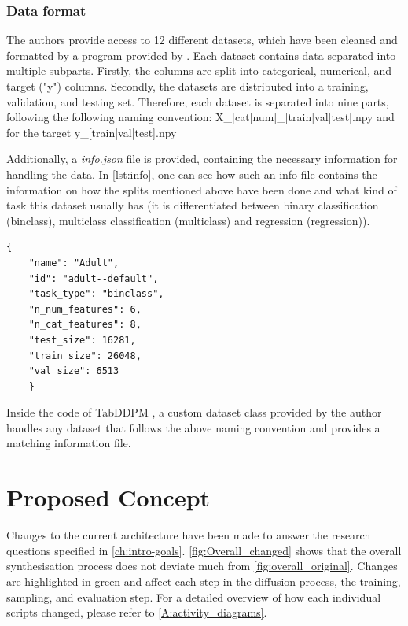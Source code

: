 \subsubsection[]{Data format}
\label{sec:data_format}
The authors provide access to 12 different datasets, which have been cleaned and formatted by a program provided by \cite{gorishniy2023EmbeddingsNumericalFeatures}.
Each dataset contains data separated into multiple subparts.
Firstly, the columns are split into categorical, numerical, and target ("y") columns.
Secondly, the datasets are distributed into a training, validation, and testing set.
Therefore, each dataset is separated into nine parts, following the following naming convention:
X\_[cat|num]\_[train|val|test].npy and for the target y\_[train|val|test].npy

Additionally, a \textit{info.json} file is provided, containing the necessary information for handling the data.
In \autoref{lst:info}, one can see how such an info-file contains the information on how the splits mentioned above have been done and what kind of task this dataset usually has (it is differentiated between binary classification (binclass), multiclass classification (multiclass) and regression (regression)).
\begin{lstlisting}[label={lst:info},caption={Example Data-info File}]
    {
    "name": "Adult",
    "id": "adult--default",
    "task_type": "binclass",
    "n_num_features": 6,
    "n_cat_features": 8,
    "test_size": 16281,
    "train_size": 26048,
    "val_size": 6513
    }
\end{lstlisting}
Inside the code of TabDDPM \cite{akim2023TabDDPMModellingTabular}, a custom dataset class provided by the author handles any dataset that follows the above naming convention and provides a matching information file.

\section{Proposed Concept}
\label{ch:conceptualDesign-changes}

Changes to the current architecture have been made to answer the research questions specified in \autoref{ch:intro-goals}.
\autoref{fig:Overall_changed} shows that the overall synthesisation process does not deviate much from \autoref{fig:overall_original}.
Changes are highlighted in green and affect each step in the diffusion process, the training, sampling, and evaluation step.
For a detailed overview of how each individual scripts changed, please refer to \autoref{A:activity_diagrams}.

